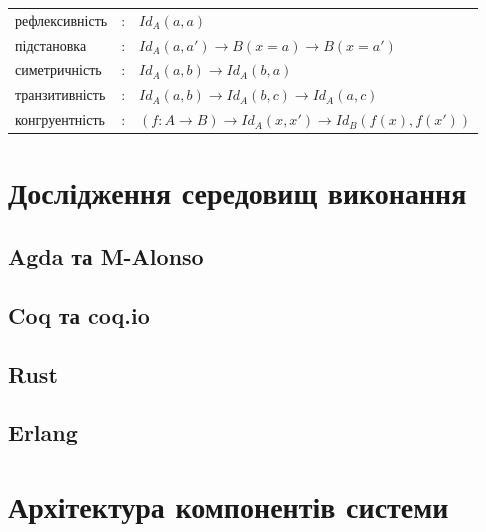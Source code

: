 \begingroup
\parbox[t][][l]{0.40\textwidth}{

\begin{prooftree}
\end{prooftree}

}
\hspace{0.1cm}
\parbox[t][][r]{0.60\textwidth}{

}\endgroup


\begin{center}
\begin{tabular}{lll}
  рефлексивність &:& $Id_A(a,a)$ \\
  підстановка     &:& $Id_A(a,a') \rightarrow B(x=a) \rightarrow B(x=a')$ \\
  симетричність  &:& $Id_A(a,b) \rightarrow Id_A(b,a)$  \\
  транзитивність &:& $Id_A(a,b) \rightarrow Id_A(b,c) \rightarrow Id_A(a,c)$ \\
  конгруентність &:& $(f: A \rightarrow B) \rightarrow Id_A(x,x') \rightarrow Id_B(f(x),f(x'))$ \\
\end{tabular}
\end{center}

\newpage
\section{Дослідження середовищ виконання}

\subsection{Agda та M-Alonso}

\subsection{Coq та coq.io}

\subsection{Rust}

\subsection{Erlang}

\section{Архітектура компонентів системи}

